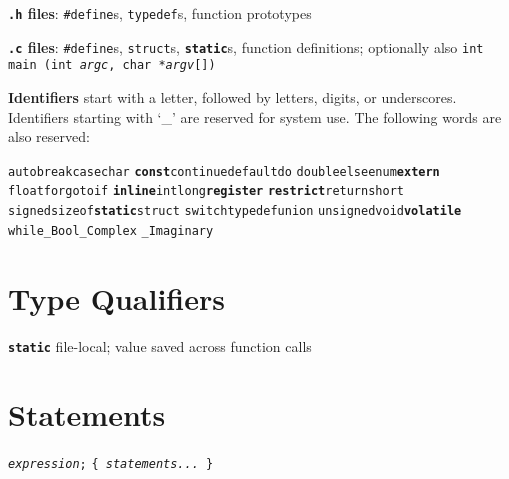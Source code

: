 \documentclass[8pt]{article}
\newcommand{\Cc}[1]{\texttt{#1}}
\newcommand{\cpp}[1]{\textcolor{black!20!cyan}{\texttt{\##1}}} %
\newcommand{\kw}[1]{\textcolor{black!40!lime}{\texttt{#1}}} %
\newcommand{\ty}[1]{\textcolor{blue!80}{\texttt{#1}}} %
\newcommand{\mty}[1]{\textcolor{blue!80}{\texttt{\textbf{#1}}}} %
\newcommand{\fn}[1]{\texttt{#1}} %
\newcommand{\var}[1]{\texttt{\textit{#1}}} %
\newcommand{\opt}[1]{\textrm{\textit{#1}}} %
\begin{document}
\begin{multicols}{3}
\textbf{\texttt{.h} files}:
\cpp{define}s, \kw{typedef}s, function prototypes

\textbf{\texttt{.c} files}:
\cpp{define}s, \kw{struct}s, \mty{static}s, function definitions;
optionally also\hfill
\Cc{\ty{int} \fn{main} (\ty{int} \var{argc}, \ty{char *}\var{argv}[])}

\textbf{Identifiers} start with a letter,
followed by letters, digits, or underscores.
Identifiers starting with `\_' are reserved for system use.
The following words are also reserved:

\begin{center}
  \kw{auto}\quad \kw{break}\quad \kw{case}\quad \ty{char}\quad
  \mty{const}\quad \kw{continue}\quad \kw{default}\quad \kw{do}\quad
  \ty{double}\quad \kw{else}\quad \ty{enum}\quad \mty{extern}\quad
  \ty{float}\quad \kw{for}\quad \kw{goto}\quad \kw{if}\quad
  \mty{inline}\quad \kw{int}\quad \kw{long}\quad \mty{register}\quad
  \mty{restrict}\quad \kw{return}\quad \ty{short}\quad
  \ty{signed}\quad \fn{sizeof}\quad \mty{static}\quad \ty{struct}\quad
  \kw{switch}\quad \kw{typedef}\quad \ty{union}\quad
  \ty{unsigned}\quad \ty{void}\quad \mty{volatile}\quad
  \kw{while}\quad \ty{\_Bool}\quad \ty{\_Complex}\quad
  \ty{\_Imaginary}\quad
\end{center}

\section*{Type Qualifiers}

\mty{static}\quad
    file-local; value saved across function calls \\


\section*{Statements}

\Cc{\opt{expression};} \hfill
\Cc{\{ \opt{statements...} \}}


\end{multicols}
\end{document}
